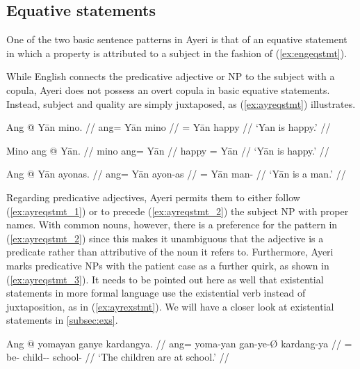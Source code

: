 \subsection{Equative statements}
\label{subsec:eqs}

One of the two basic sentence patterns in Ayeri is that of an equative
statement in which a property is attributed to a subject in the fashion of 
(\ref{ex:engeqstmt}).

\pex\label{ex:engeqstmt}
\a\label{ex:engeqstmt_1} 
\a\label{ex:engeqstmt_2} 
\xe

While English connects the predicative adjective or NP to the subject with a
copula, Ayeri does not possess an overt copula in basic equative statements.
Instead, subject and quality are simply juxtaposed, as (\ref{ex:ayreqstmt})
illustrates.

\pex\label{ex:ayreqstmt}
\a\label{ex:ayreqstmt_1}\begingl
	\gla Ang @ Yān mino. //
	\glb ang= Yān mino //
	\glc \Aarg{}= Yān happy //
	\glft `Yan is happy.' //
\endgl

\a\label{ex:ayreqstmt_2}\begingl
	\gla Mino ang @ Yān. //
	\glb mino ang= Yān //
	\glc happy \Aarg{}= Yān //
	\glft `Yān is happy.' //
\endgl

\a\label{ex:ayreqstmt_3}\begingl
	\gla Ang @ Yān ayonas. //
	\glb ang= Yān ayon-as //
	\glc \Aarg{}= Yān man-\Parg{} //
	\glft `Yān is a man.' //
\endgl

\xe

Regarding predicative adjectives, Ayeri permits them to either follow
(\ref{ex:ayreqstmt_1}) or to precede (\ref{ex:ayreqstmt_2}) the subject NP with
proper names. With common nouns, however, there is a preference for the pattern
in (\ref{ex:ayreqstmt_2}) since this makes it unambiguous that the adjective is
a predicate rather than attributive of the noun it refers to. Furthermore,
Ayeri marks predicative NPs with the patient case as a further quirk, as shown
in (\ref{ex:ayreqstmt_3}). It needs to be pointed out here as well that
existential statements in more formal language use the existential verb
 instead of juxtaposition, as in 
(\ref{ex:ayrexstmt}). We will have a closer look at existential statements in
\autoref{subsec:exs}.

\ex\label{ex:ayrexstmt}\begingl
	\gla Ang @ yomayan ganye kardangya. //
	\glb ang= yoma-yan gan-ye-Ø kardang-ya //
	\glc \AgtT{}= be-\TplM{} child-\Pl{}-\Top{} school-\Loc{} //
	\glft `The children are at school.' //
\endgl\xe

